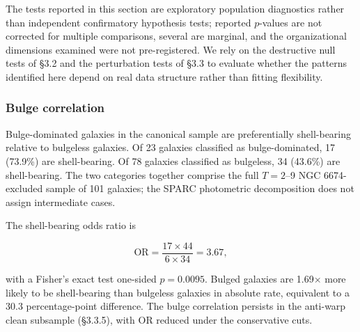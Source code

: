 \documentclass[linenumbers,trackchanges]{aastex701}
\begin{document}
The tests reported in this section are exploratory population diagnostics rather than independent confirmatory hypothesis tests; reported $p$-values are not corrected for multiple comparisons, several are marginal, and the organizational dimensions examined were not pre-registered. We rely on the destructive null tests of \S3.2 and the perturbation tests of \S3.3 to evaluate whether the patterns identified here depend on real data structure rather than fitting flexibility.

\subsubsection{Bulge correlation}

Bulge-dominated galaxies in the canonical sample are preferentially shell-bearing relative to bulgeless galaxies. Of 23 galaxies classified as bulge-dominated, 17 (73.9\%) are shell-bearing. Of 78 galaxies classified as bulgeless, 34 (43.6\%) are shell-bearing. The two categories together comprise the full $T = 2$--9 NGC 6674-excluded sample of 101 galaxies; the SPARC photometric decomposition does not assign intermediate cases.

The shell-bearing odds ratio is

\begin{equation}
\text{OR} = \frac{17 \times 44}{6 \times 34} = 3.67,
\end{equation}

with a Fisher's exact test one-sided $p = 0.0095$. Bulged galaxies are 1.69$\times$ more likely to be shell-bearing than bulgeless galaxies in absolute rate, equivalent to a 30.3 percentage-point difference. The bulge correlation persists in the anti-warp clean subsample (\S3.3.5), with OR reduced under the conservative cuts.
\end{document}
